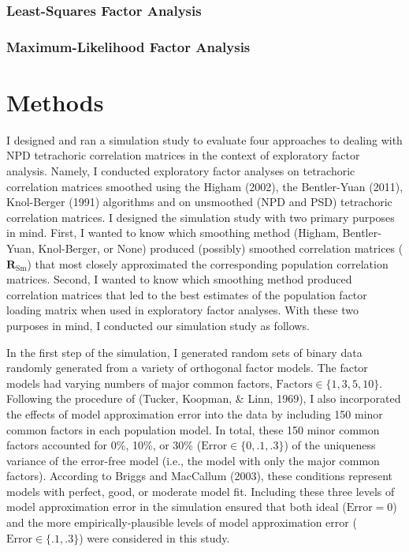 \documentclass[man]{apa6}
\begin{document}
\hypertarget{least-squares-factor-analysis}{%
\subsubsection{Least-Squares Factor Analysis}\label{least-squares-factor-analysis}}

\hypertarget{maximum-likelihood-factor-analysis}{%
\subsubsection{Maximum-Likelihood Factor Analysis}\label{maximum-likelihood-factor-analysis}}

\hypertarget{methods}{%
\section{Methods}\label{methods}}

I designed and ran a simulation study to evaluate four approaches to dealing with NPD tetrachoric correlation matrices in the context of exploratory factor analysis. Namely, I conducted exploratory factor analyses on tetrachoric correlation matrices smoothed using the Higham (2002), the Bentler-Yuan (2011), Knol-Berger (1991) algorithms and on unsmoothed (NPD and PSD) tetrachoric correlation matrices. I designed the simulation study with two primary purposes in mind. First, I wanted to know which smoothing method (Higham, Bentler-Yuan, Knol-Berger, or None) produced (possibly) smoothed correlation matrices (\(\mathbf{R}_{\textrm{Sm}}\)) that most closely approximated the corresponding population correlation matrices. Second, I wanted to know which smoothing method produced correlation matrices that led to the best estimates of the population factor loading matrix when used in exploratory factor analyses. With these two purposes in mind, I conducted our simulation study as follows.

In the first step of the simulation, I generated random sets of binary data randomly generated from a variety of orthogonal factor models. The factor models had varying numbers of major common factors, \(\textrm{Factors} \in \{1, 3, 5, 10 \}\). Following the procedure of (Tucker, Koopman, \& Linn, 1969), I also incorporated the effects of model approximation error into the data by including 150 minor common factors in each population model. In total, these 150 minor common factors accounted for 0\%, 10\%, or 30\% (\(\textrm{Error} \in \{ 0, .1, .3 \}\)) of the uniqueness variance of the error-free model (i.e., the model with only the major common factors). According to Briggs and MacCallum (2003), these conditions represent models with perfect, good, or moderate model fit. Including these three levels of model approximation error in the simulation ensured that both ideal (\(\textrm{Error} = 0\)) and the more empirically-plausible levels of model approximation error (\(\textrm{Error} \in \{ .1, .3\}\)) were considered in this study.
\end{document}

